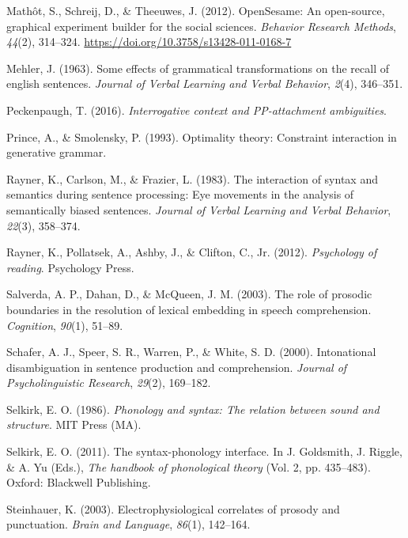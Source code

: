 \documentclass[12pt,oneside]{book}
\begin{document}
\leavevmode\hypertarget{ref-os2012}{}%
Mathôt, S., Schreij, D., \& Theeuwes, J. (2012). OpenSesame: An open-source, graphical experiment builder for the social sciences. \emph{Behavior Research Methods}, \emph{44}(2), 314--324. \url{https://doi.org/10.3758/s13428-011-0168-7}

\leavevmode\hypertarget{ref-mehler1963some}{}%
Mehler, J. (1963). Some effects of grammatical transformations on the recall of english sentences. \emph{Journal of Verbal Learning and Verbal Behavior}, \emph{2}(4), 346--351.

\leavevmode\hypertarget{ref-qp2}{}%
Peckenpaugh, T. (2016). \emph{Interrogative context and PP-attachment ambiguities}.

\leavevmode\hypertarget{ref-Prince1993-ic}{}%
Prince, A., \& Smolensky, P. (1993). Optimality theory: Constraint interaction in generative grammar.

\leavevmode\hypertarget{ref-raynerEtAl1983}{}%
Rayner, K., Carlson, M., \& Frazier, L. (1983). The interaction of syntax and semantics during sentence processing: Eye movements in the analysis of semantically biased sentences. \emph{Journal of Verbal Learning and Verbal Behavior}, \emph{22}(3), 358--374.

\leavevmode\hypertarget{ref-rayner2012psychology}{}%
Rayner, K., Pollatsek, A., Ashby, J., \& Clifton, C., Jr. (2012). \emph{Psychology of reading}. Psychology Press.

\leavevmode\hypertarget{ref-salverda2003role}{}%
Salverda, A. P., Dahan, D., \& McQueen, J. M. (2003). The role of prosodic boundaries in the resolution of lexical embedding in speech comprehension. \emph{Cognition}, \emph{90}(1), 51--89.

\leavevmode\hypertarget{ref-schafer2000intonational}{}%
Schafer, A. J., Speer, S. R., Warren, P., \& White, S. D. (2000). Intonational disambiguation in sentence production and comprehension. \emph{Journal of Psycholinguistic Research}, \emph{29}(2), 169--182.

\leavevmode\hypertarget{ref-Selkirk1986-hc}{}%
Selkirk, E. O. (1986). \emph{Phonology and syntax: The relation between sound and structure}. MIT Press (MA).

\leavevmode\hypertarget{ref-selkirk2011-hp}{}%
Selkirk, E. O. (2011). The syntax-phonology interface. In J. Goldsmith, J. Riggle, \& A. Yu (Eds.), \emph{The handbook of phonological theory} (Vol. 2, pp. 435--483). Oxford: Blackwell Publishing.

\leavevmode\hypertarget{ref-p600addscps}{}%
Steinhauer, K. (2003). Electrophysiological correlates of prosody and punctuation. \emph{Brain and Language}, \emph{86}(1), 142--164.
\end{document}
